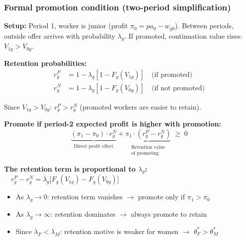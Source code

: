 \documentclass[aspectratio=169, 11pt]{beamer}
\begin{document}
\begin{frame}[label=foc-formal]
\frametitle{Formal promotion condition (two-period simplification)}

\small
\textbf{Setup:} Period 1, worker is junior (profit $\pi_0 = pa_0 - w_{g0}$). Between periods, outside offer arrives with probability $\lambda_g$. If promoted, continuation value rises: $V_{1g} > V_{0g}$.

\vspace{0.1cm}
\textbf{Retention probabilities:}
\vspace{-0.1cm}
\begin{align*}
    r_g^P &= 1 - \lambda_g[1 - F_g(V_{1g})] \quad \text{(if promoted)} \\
    r_g^N &= 1 - \lambda_g[1 - F_g(V_{0g})] \quad \text{(if not promoted)}
\end{align*}

\vspace{-0.2cm}
Since $V_{1g} > V_{0g}$: $r_g^P > r_g^N$ (promoted workers are easier to retain).

\vspace{0.1cm}
\textbf{Promote if period-2 expected profit is higher with promotion:}
\begin{equation*}
    \underbrace{(\pi_1 - \pi_0) \cdot r_g^N}_{\substack{\text{Direct profit effect}}} + \underbrace{\pi_1 \cdot (r_g^P - r_g^N)}_{\substack{\text{Retention value} \\ \text{of promoting}}} \;\geq\; 0
\end{equation*}

\vspace{0.1cm}
\textbf{The retention term is proportional to $\lambda_g$:}
$\quad r_g^P - r_g^N = \lambda_g \bigl[F_g(V_{1g}) - F_g(V_{0g})\bigr]$

\vspace{0.1cm}
\begin{itemize}
    \item As $\lambda_g \to 0$: retention term vanishes $\to$ promote only if $\pi_1 > \pi_0$
    \item As $\lambda_g \to \infty$: retention dominates $\to$ always promote to retain
    \item Since $\lambda_F < \lambda_M$: retention motive is weaker for women $\to$ $\theta_F^* > \theta_M^*$
\end{itemize}

\hfill\hyperlink{retentionslide}{}

\end{frame}
\end{document}

